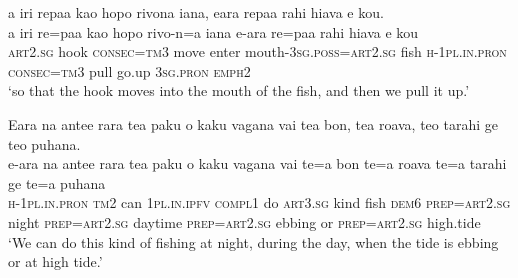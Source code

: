 \newpage
\ea\label{ex:text26-13}
a iri repaa kao hopo rivona iana, eara repaa rahi hiava e kou.\\
\gll a	iri	re=paa	kao	hopo	rivo-n=a	iana	e-ara	re=paa	rahi	hiava	e	kou\\
     \textsc{art}2.\textsc{sg}	hook	\textsc{consec}=\textsc{tm}3	move	enter	mouth-3\textsc{sg}.\textsc{poss}=\textsc{art}2.\textsc{sg}	fish	\textsc{h}-1\textsc{pl}.\textsc{in}.\textsc{pron}	\textsc{consec}=\textsc{tm}3	pull	go.up	3\textsc{sg}.\textsc{pron}	\textsc{emph}2\\
\glt `so that the hook moves into the mouth of the fish, and then we pull it up.'
\z

\ea\label{ex:text26-14}
Eara na antee rara tea paku o kaku vagana vai tea bon, tea roava, teo tarahi ge teo puhana.\\
\gll e-ara	na	antee	rara	tea	paku	o	kaku	vagana	vai	te=a	bon	te=a	roava	te=a	tarahi	ge	te=a	puhana\\
     \textsc{h}-1\textsc{pl}.\textsc{in}.\textsc{pron}	\textsc{tm}2	can	1\textsc{pl}.\textsc{in}.\textsc{ipfv}	\textsc{compl}1	do	\textsc{art}3.\textsc{sg}	kind	fish	\textsc{dem}6	\textsc{prep}=\textsc{art}2.\textsc{sg}	night	\textsc{prep}=\textsc{art}2.\textsc{sg}	daytime	\textsc{prep}=\textsc{art}2.\textsc{sg}	ebbing	or	\textsc{prep}=\textsc{art}2.\textsc{sg}	high.tide\\
\glt `We can do this kind of fishing at night, during the day, when the tide is ebbing or at high tide.'
\z
